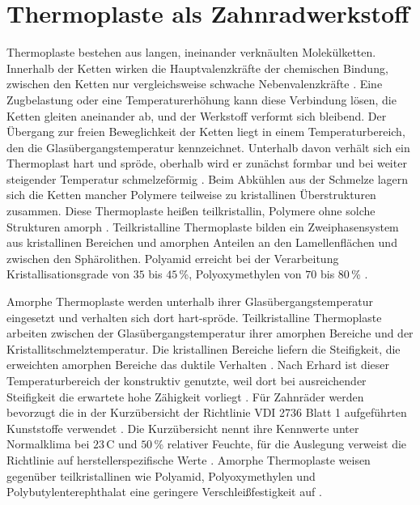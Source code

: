 \section{Thermoplaste als Zahnradwerkstoff}
\label{sec:thermoplaste}

Thermoplaste bestehen aus langen, ineinander verknäulten Molekülketten. Innerhalb der Ketten wirken die Hauptvalenzkräfte der chemischen Bindung, zwischen den Ketten nur vergleichsweise schwache Nebenvalenzkräfte \cite[S.~29]{Sto18}. Eine Zugbelastung oder eine Temperaturerhöhung kann diese Verbindung lösen, die Ketten gleiten aneinander ab, und der Werkstoff verformt sich bleibend. Der Übergang zur freien Beweglichkeit der Ketten liegt in einem Temperaturbereich, den die Glasübergangstemperatur kennzeichnet. Unterhalb davon verhält sich ein Thermoplast hart und spröde, oberhalb wird er zunächst formbar und bei weiter steigender Temperatur schmelzeförmig \cite[S.~29]{Sto18}. Beim Abkühlen aus der Schmelze lagern sich die Ketten mancher Polymere teilweise zu kristallinen Überstrukturen zusammen. Diese Thermoplaste heißen teilkristallin, Polymere ohne solche Strukturen amorph \cite[S.~30]{Sto18}. Teilkristalline Thermoplaste bilden ein Zweiphasensystem aus kristallinen Bereichen und amorphen Anteilen an den Lamellenflächen und zwischen den Sphärolithen. Polyamid erreicht bei der Verarbeitung Kristallisationsgrade von $35$ bis $45$\,\%, Polyoxymethylen von $70$ bis $80$\,\% \cite[S.~59 bis 60]{Erh08}.

Amorphe Thermoplaste werden unterhalb ihrer Glasübergangstemperatur eingesetzt und verhalten sich dort hart-spröde. Teilkristalline Thermoplaste arbeiten zwischen der Glasübergangstemperatur ihrer amorphen Bereiche und der Kristallitschmelztemperatur. Die kristallinen Bereiche liefern die Steifigkeit, die erweichten amorphen Bereiche das duktile Verhalten \cite[S.~30 bis 31]{Sto18}. Nach Erhard ist dieser Temperaturbereich der konstruktiv genutzte, weil dort bei ausreichender Steifigkeit die erwartete hohe Zähigkeit vorliegt \cite[S.~70]{Erh08}. Für Zahnräder werden bevorzugt die in der Kurzübersicht der Richtlinie VDI 2736 Blatt 1 aufgeführten Kunststoffe verwendet \cite[S.~5]{VDI2736-1}. Die Kurzübersicht nennt ihre Kennwerte unter Normalklima bei $23$\,\textdegree C und $50$\,\% relativer Feuchte, für die Auslegung verweist die Richtlinie auf herstellerspezifische Werte \cite[S.~5 bis 6]{VDI2736-1}. Amorphe Thermoplaste weisen gegenüber teilkristallinen wie Polyamid, Polyoxymethylen und Polybutylenterephthalat eine geringere Verschleißfestigkeit auf \cite[S.~19]{VDI2736-1}.


